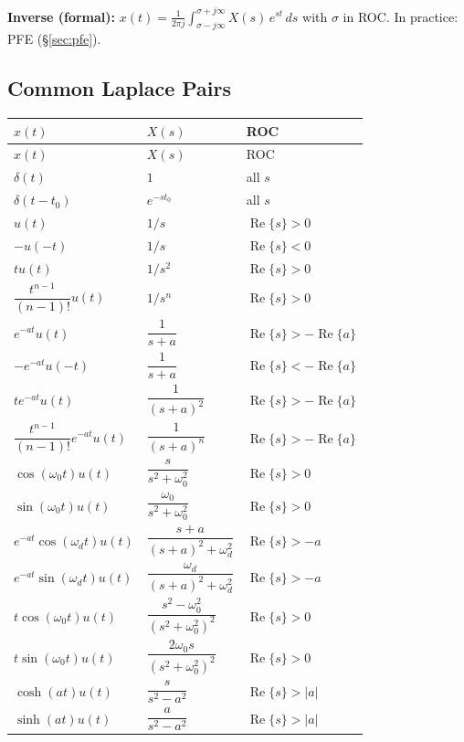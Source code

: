 \documentclass[10pt]{article}
\newcommand{\Real}{\operatorname{Re}}
\begin{document}
\textbf{Inverse (formal):} $\displaystyle x(t) = \frac{1}{2\pi j}\int_{\sigma - j\infty}^{\sigma + j\infty} X(s)\,e^{st}\,ds$ with $\sigma$ in ROC. In practice: PFE (\S\ref{sec:pfe}).

\subsection{Common Laplace Pairs}
\begin{longtable}{@{}lll@{}}
\toprule $x(t)$ & $X(s)$ & ROC \\ \midrule \endfirsthead
\toprule $x(t)$ & $X(s)$ & ROC \\ \midrule \endhead
\bottomrule \endfoot
$\delta(t)$ & $1$ & all $s$ \\
$\delta(t - t_0)$ & $e^{-st_0}$ & all $s$ \\
$u(t)$ & $1/s$ & $\Real\{s\} > 0$ \\
$-u(-t)$ & $1/s$ & $\Real\{s\} < 0$ \\
$t u(t)$ & $1/s^2$ & $\Real\{s\} > 0$ \\
$\dfrac{t^{n-1}}{(n-1)!}u(t)$ & $1/s^n$ & $\Real\{s\} > 0$ \\
$e^{-at}u(t)$ & $\dfrac{1}{s + a}$ & $\Real\{s\} > -\Real\{a\}$ \\
$-e^{-at}u(-t)$ & $\dfrac{1}{s + a}$ & $\Real\{s\} < -\Real\{a\}$ \\
$t e^{-at}u(t)$ & $\dfrac{1}{(s + a)^2}$ & $\Real\{s\} > -\Real\{a\}$ \\
$\dfrac{t^{n-1}}{(n-1)!}e^{-at}u(t)$ & $\dfrac{1}{(s + a)^n}$ & $\Real\{s\} > -\Real\{a\}$ \\
$\cos(\omega_0 t)u(t)$ & $\dfrac{s}{s^2 + \omega_0^2}$ & $\Real\{s\} > 0$ \\
$\sin(\omega_0 t)u(t)$ & $\dfrac{\omega_0}{s^2 + \omega_0^2}$ & $\Real\{s\} > 0$ \\
$e^{-at}\cos(\omega_d t)u(t)$ & $\dfrac{s + a}{(s + a)^2 + \omega_d^2}$ & $\Real\{s\} > -a$ \\
$e^{-at}\sin(\omega_d t)u(t)$ & $\dfrac{\omega_d}{(s + a)^2 + \omega_d^2}$ & $\Real\{s\} > -a$ \\
$t\cos(\omega_0 t)u(t)$ & $\dfrac{s^2 - \omega_0^2}{(s^2 + \omega_0^2)^2}$ & $\Real\{s\} > 0$ \\
$t\sin(\omega_0 t)u(t)$ & $\dfrac{2\omega_0 s}{(s^2 + \omega_0^2)^2}$ & $\Real\{s\} > 0$ \\
$\cosh(at)u(t)$ & $\dfrac{s}{s^2 - a^2}$ & $\Real\{s\} > |a|$ \\
$\sinh(at)u(t)$ & $\dfrac{a}{s^2 - a^2}$ & $\Real\{s\} > |a|$ \\
\end{longtable}
\end{document}

